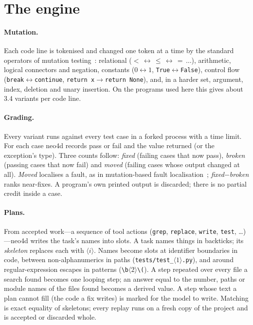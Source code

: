 \documentclass[10pt]{article}
\newcommand{\slot}[1]{\ensuremath{\langle #1\rangle}}
\begin{document}
\section{The engine}
\label{sec:engine}

\paragraph{Mutation.} Each code line is tokenised and changed one token at a time by the standard operators of
mutation testing~\cite{demillo1978,jia2011}: relational ($<\,\leftrightarrow\,\le\,\leftrightarrow\,=\,\ldots$),
arithmetic, logical connectors and negation, constants ($0\leftrightarrow1$, \texttt{True}$\leftrightarrow$\texttt{False}),
control flow (\texttt{break}$\leftrightarrow$\texttt{continue}, \texttt{return x}$\to$\texttt{return None}), and, in a
harder set, argument, index, deletion and unary insertion. On the programs used here this gives about 3.4 variants per
code line.

\paragraph{Grading.} Every variant runs against every test case in a forked process with a time limit. For each case
neo4d records pass or fail and the value returned (or the exception's type). Three counts follow: \emph{fixed}
(failing cases that now pass), \emph{broken} (passing cases that now fail) and \emph{moved} (failing cases whose
output changed at all). \emph{Moved} localises a fault, as in mutation-based fault localisation~\cite{metallaxis};
\emph{fixed}$-$\emph{broken} ranks near-fixes. A program's own printed output is discarded; there is no partial
credit inside a case.

\paragraph{Plans.} From accepted work---a sequence of tool actions (\texttt{grep}, \texttt{replace}, \texttt{write},
\texttt{test}, \ldots)---neo4d writes the task's names into slots. A task names things in backticks; its
\emph{skeleton} replaces each with \slot{i}. Names become slots at identifier boundaries in code, between
non-alphanumerics in paths (\texttt{tests/test\_\slot{1}.py}), and around regular-expression escapes in patterns
(\texttt{\textbackslash b\slot{2}\textbackslash(}). A step repeated over every file a search found becomes one looping
step; an answer equal to the number, paths or module names of the files found becomes a derived value. A step whose
text a plan cannot fill (the code a fix writes) is marked for the model to write. Matching is exact equality of
skeletons; every replay runs on a fresh copy of the project and is accepted or discarded whole.
\end{document}
